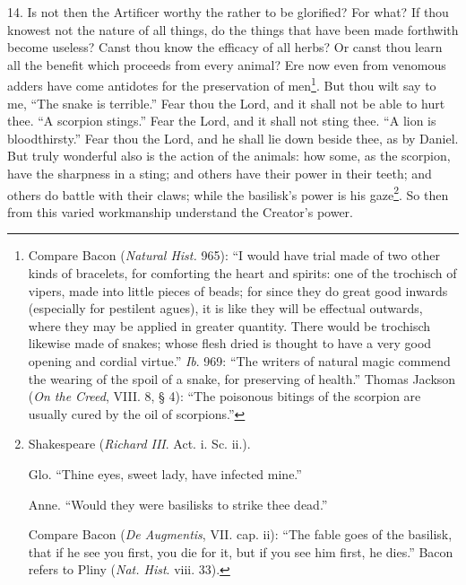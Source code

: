 14. Is not then the Artificer worthy the rather to be glorified? For what? If thou knowest not the nature of all things, do the things that have been made forthwith become useless? Canst thou know the efficacy of all herbs? Or canst thou learn all the benefit which proceeds from every animal? Ere now even from venomous adders have come antidotes for the preservation of men\footnote{Compare Bacon (\emph{Natural Hist.} 965): “I would have trial made of two other kinds of bracelets, for comforting the heart and spirits: one of the trochisch of vipers, made into little pieces of beads; for since they do great good inwards (especially for pestilent agues), it is like they will be effectual outwards, where they may be applied in greater quantity. There would be trochisch likewise made of snakes; whose flesh dried is thought to have a very good opening and cordial virtue.” \emph{Ib}. 969: “The writers of natural magic commend the wearing of the spoil of a snake, for preserving of health.” Thomas Jackson (\emph{On the Creed}, VIII. 8, § 4): “The poisonous bitings of the scorpion are usually cured by the oil of scorpions.”}. But thou wilt say to me, “The snake is terrible.” Fear thou the Lord, and it shall not be able to hurt thee. “A scorpion stings.” Fear the Lord, and it shall not sting thee. “A lion is bloodthirsty.” Fear thou the Lord, and he shall lie down beside thee, as by Daniel. But truly wonderful also is the action of the animals: how some, as the scorpion, have the sharpness in a sting; and others have their power in their teeth; and others do battle with their claws; while the basilisk’s power is his gaze\footnote{Shakespeare (\emph{Richard III}. Act. i. Sc. ii.). \par Glo. “Thine eyes, sweet lady, have infected mine.” \par Anne. “Would they were basilisks to strike thee dead.” \par Compare Bacon (\emph{De Augmentis}, VII. cap. ii): “The fable goes of the basilisk, that if he see you first, you die for it, but if you see him first, he dies.” Bacon refers to Pliny (\emph{Nat. Hist}. viii. 33).}. So then from this varied workmanship understand the Creator’s power.

